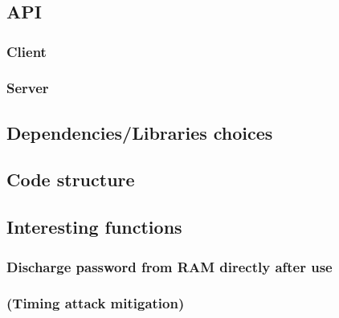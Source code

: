 \documentclass[../report.tex]{subfiles}
\begin{document}
\chapter{}
\section{API}
\subsection{Client}
\subsection{Server}
\section{Dependencies/Libraries choices}
\section{Code structure}
\section{Interesting functions}
\subsection{Discharge password from RAM directly after use}
\subsection{(Timing attack mitigation)}
\end{document}
